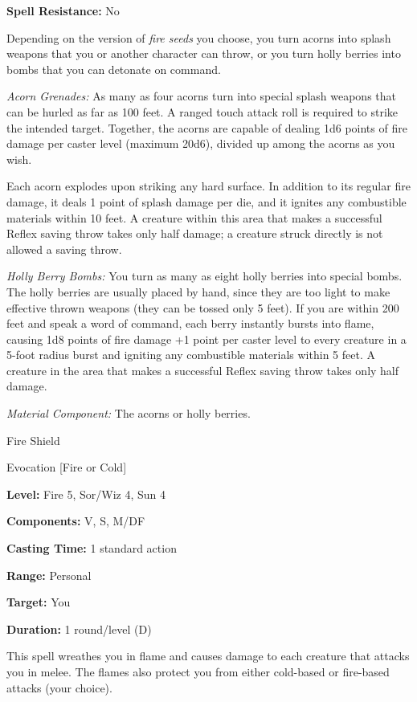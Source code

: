 \documentclass{article}
\begin{document}
\textbf{Spell Resistance:} No

Depending on the version of \textit{fire seeds }you choose, you turn acorns into 
splash weapons that you or another character can throw, or you turn holly berries 
into bombs that you can detonate on command.

\textit{Acorn Grenades: }As many as four acorns turn into special splash weapons 
that can be hurled as far as 100 feet. A ranged touch attack roll is required to 
strike the intended target. Together, the acorns are capable of dealing 1d6 points 
of fire damage per caster level (maximum 20d6), divided up among the acorns as 
you wish.

Each acorn explodes upon striking any hard surface. In addition to its regular 
fire damage, it deals 1 point of splash damage per die, and it ignites any combustible 
materials within 10 feet. A creature within this area that makes a successful Reflex 
saving throw takes only half damage; a creature struck directly is not allowed 
a saving throw.

\textit{Holly Berry Bombs: }You turn as many as eight holly berries into special 
bombs. The holly berries are usually placed by hand, since they are too light to 
make effective thrown weapons (they can be tossed only 5 feet). If you are within 
200 feet and speak a word of command, each berry instantly bursts into flame, causing 
1d8 points of fire damage +1 point per caster level to every creature in a 5-foot 
radius burst and igniting any combustible materials within 5 feet. A creature in 
the area that makes a successful Reflex saving throw takes only half damage.

\textit{Material Component: }The acorns or holly berries.

\vspace{12pt}
Fire Shield

Evocation [Fire or Cold]

\textbf{Level:} Fire 5, Sor/Wiz 4, Sun 4

\textbf{Components:} V, S, M/DF

\textbf{Casting Time:} 1 standard action

\textbf{Range:} Personal

\textbf{Target:} You

\textbf{Duration:} 1 round/level (D)

This spell wreathes you in flame and causes damage to each creature that attacks 
you in melee. The flames also protect you from either cold-based or fire-based 
attacks (your choice).
\end{document}
